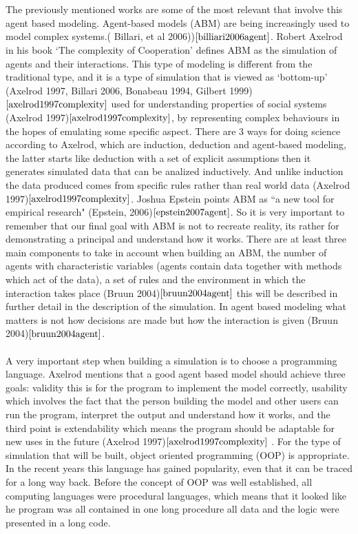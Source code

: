 \documentclass{article}
\begin{document}
\\\\The previously mentioned works are some of the most relevant that involve this agent based modeling. Agent-based models (ABM) are being increasingly used to model complex systems.( Billari, et al 2006))$\cite{billiari2006agent}$. Robert Axelrod in his book `The complexity of Cooperation’ defines ABM as the simulation of agents and their interactions. This type of modeling is different from the traditional type, and it is a type of simulation that is viewed as `bottom-up’ (Axelrod 1997, Billari 2006, Bonabeau 1994, Gilbert 1999)$\cite{axelrod1997complexity}$ used for understanding properties of social systems (Axelrod 1997)$\cite{axelrod1997complexity}$, by representing complex behaviours in the hopes of emulating some specific aspect. There are 3 ways for doing science according to Axelrod, which are induction, deduction and agent-based modeling, the latter starts like deduction with a set of explicit assumptions then it generates simulated data that can be analized inductively. And unlike induction the data produced comes from specific rules rather than real world data (Axelrod 1997)$\cite{axelrod1997complexity}$. Joshua Epstein points ABM as ``a new tool for empirical research" (Epstein, 2006)$\cite{epstein2007agent}$. So it is very important to remember that our final goal with ABM is not to recreate reality, its rather for demonstrating a principal and understand how it works. 
There are at least three main components to take in account when building an ABM, the number of agents with characteristic variables (agents contain data together with methods which act of the data), a set of rules and the environment in which the interaction takes place (Bruun 2004)$\cite{bruun2004agent}$ this will be described in further detail in the description of the simulation. In agent based modeling what matters is not how decisions are made but how the interaction is given (Bruun 2004)$\cite{bruun2004agent}$. 
\\\\A very important step when building a simulation is to choose a programming language. Axelrod mentions that a good agent based model should achieve three goals: validity this is for the program to implement the model correctly, usability which involves the fact that the person building the model and other users can run the program, interpret the output and understand how it works, and the third point is extendability which means the program should be adaptable for new uses in the future (Axelrod 1997)$\cite{axelrod1997complexity}$ . For the type of simulation that will be built, object oriented programming (OOP) is appropriate. In the recent years this language has gained popularity, even that it can be traced for a long way back. Before the concept of OOP was well established, all computing languages were procedural languages, which means that it looked like he program was all contained in one long procedure all data and the logic were presented in a long code.
\end{document}
